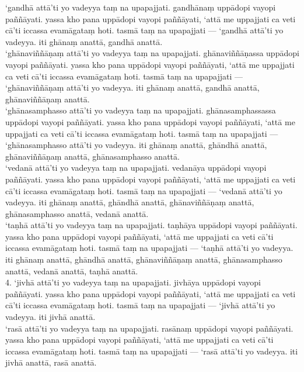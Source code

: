 \documentclass[11pt]{article}
\begin{document}
‘gandhā attā’ti yo vadeyya taṃ na upapajjati. gandhānaṃ uppādopi vayopi paññāyati. yassa kho pana uppādopi vayopi paññāyati, ‘attā me uppajjati ca veti cā’ti iccassa evamāgataṃ hoti. tasmā taṃ na upapajjati — ‘gandhā attā’ti yo vadeyya. iti ghānaṃ anattā, gandhā anattā.\\

‘ghānaviññāṇaṃ attā’ti yo vadeyya taṃ na upapajjati. ghānaviññāṇassa uppādopi vayopi paññāyati. yassa kho pana uppādopi vayopi paññāyati, ‘attā me uppajjati ca veti cā’ti iccassa evamāgataṃ hoti. tasmā taṃ na upapajjati — ‘ghānaviññāṇaṃ attā’ti yo vadeyya. iti ghānaṃ anattā, gandhā anattā, ghānaviññāṇaṃ anattā.\\

‘ghānasamphasso attā’ti yo vadeyya taṃ na upapajjati. ghānasamphassassa uppādopi vayopi paññāyati. yassa kho pana uppādopi vayopi paññāyati, ‘attā me uppajjati ca veti cā’ti iccassa evamāgataṃ hoti. tasmā taṃ na upapajjati — ‘ghānasamphasso attā’ti yo vadeyya. iti ghānaṃ anattā, ghāndhā anattā, ghānaviññāṇaṃ anattā, ghānasamphasso anattā.\\

‘vedanā attā’ti yo vadeyya taṃ na upapajjati. vedanāya uppādopi vayopi paññāyati. yassa kho pana uppādopi vayopi paññāyati, ‘attā me uppajjati ca veti cā’ti iccassa evamāgataṃ hoti. tasmā taṃ na upapajjati — ‘vedanā attā’ti yo vadeyya. iti ghānaṃ anattā, ghāndhā anattā, ghānaviññāṇaṃ anattā, ghānasamphasso anattā, vedanā anattā.\\

‘taṇhā attā’ti yo vadeyya taṃ na upapajjati. taṇhāya uppādopi vayopi paññāyati. yassa kho pana uppādopi vayopi paññāyati, ‘attā me uppajjati ca veti cā’ti iccassa evamāgataṃ hoti. tasmā taṃ na upapajjati — ‘taṇhā attā’ti yo vadeyya. iti ghānaṃ anattā, ghāndhā anattā, ghānaviññāṇaṃ anattā, ghānasamphasso anattā, vedanā anattā, taṇhā anattā.\\

4. ‘jivhā attā’ti yo vadeyya taṃ na upapajjati. jivhāya uppādopi vayopi paññāyati. yassa kho pana uppādopi vayopi paññāyati, ‘attā me uppajjati ca veti cā’ti iccassa evamāgataṃ hoti. tasmā taṃ na upapajjati — ‘jivhā attā’ti yo vadeyya. iti jivhā anattā.\\

‘rasā attā’ti yo vadeyya taṃ na upapajjati. rasānaṃ uppādopi vayopi paññāyati. yassa kho pana uppādopi vayopi paññāyati, ‘attā me uppajjati ca veti cā’ti iccassa evamāgataṃ hoti. tasmā taṃ na upapajjati — ‘rasā attā’ti yo vadeyya. iti jivhā anattā, rasā anattā.\\
\end{document}
